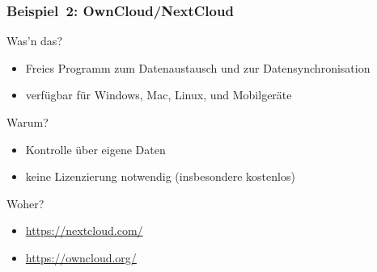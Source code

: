 \documentclass{beamer}
\begin{document}
\begin{frame}
  \frametitle{Beispiel~2: OwnCloud/NextCloud}

  \onslide<+->

  \begin{block}{Was'n das?}
    \begin{itemize}
    \item Freies Programm zum Datenaustausch und zur Datensynchronisation
    \item verfügbar für Windows, Mac, Linux, und Mobilgeräte
    \end{itemize}
  \end{block}

  \onslide<+->

  \begin{block}{Warum?}
    \begin{itemize}
    \item Kontrolle über eigene Daten
    \item keine Lizenzierung notwendig (insbesondere kostenlos)
    \end{itemize}
  \end{block}

  \onslide<+->

  \begin{block}{Woher?}
    \begin{itemize}
    \item \url{https://nextcloud.com/}
    \item \url{https://owncloud.org/}
    \end{itemize}
  \end{block}


\end{frame}
\end{document}
